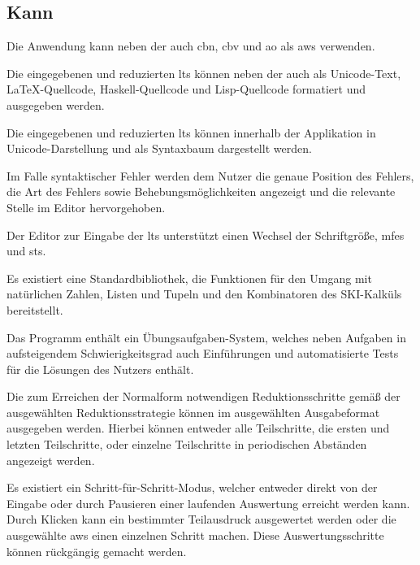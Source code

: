 \documentclass[parskip=full,11pt,twoside]{scrartcl}
\begin{document}

\subsection{Kann}

Die Anwendung kann neben der  auch \gls{cbn}, \gls{cbv}
und \gls{ao} als \gls{aws} verwenden.

Die eingegebenen und reduzierten \glspl{lt} können neben der 
auch als Unicode-Text, \LaTeX-Quellcode, Haskell-Quellcode und Lisp-Quellcode formatiert und ausgegeben
werden.

Die eingegebenen und reduzierten \glspl{lt} können innerhalb der Applikation in Unicode-Darstellung und als Syntaxbaum
dargestellt werden.

Im Falle syntaktischer Fehler werden dem Nutzer die genaue Position des Fehlers, die
Art des Fehlers sowie Behebungsmöglichkeiten angezeigt und die relevante Stelle im
Editor hervorgehoben.

Der Editor zur Eingabe der \glspl{lt} unterstützt einen Wechsel der Schriftgröße,
\glspl{mfe} und \glspl{st}.

Es existiert eine Standardbibliothek, die Funktionen für den Umgang mit natürlichen
Zahlen, Listen und Tupeln und den Kombinatoren des SKI-Kalküls bereitstellt.

Das Programm enthält ein Übungsaufgaben-System, welches neben Aufgaben in aufsteigendem
Schwierigkeitsgrad auch Einführungen und automatisierte Tests für die Lösungen des Nutzers
enthält.

Die zum Erreichen der Normalform notwendigen Reduktionsschritte gemäß der ausgewählten
Reduktionsstrategie können im ausgewählten Ausgabeformat ausgegeben werden. Hierbei
können entweder alle Teilschritte, die ersten und letzten Teilschritte, oder
einzelne Teilschritte in periodischen Abständen angezeigt werden.

Es existiert ein Schritt-für-Schritt-Modus, welcher entweder direkt von der Eingabe
oder durch Pausieren einer laufenden Auswertung erreicht werden kann.
Durch Klicken kann ein bestimmter Teilausdruck ausgewertet werden oder die ausgewählte
\gls{aws} einen einzelnen Schritt machen. Diese Auswertungsschritte können rückgängig
gemacht werden.
\end{document}
